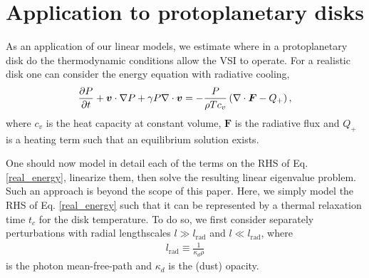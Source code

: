 \section{Application to protoplanetary disks}\label{application} 
As an application of our linear models, we estimate where in a
protoplanetary disk do the thermodynamic conditions allow the VSI to
operate. For a realistic disk one can consider the energy equation with
radiative cooling, 
\begin{align}\label{real_energy}
\frac{\partial P}{\partial t} + \bm{v}\cdot\nabla P +\gamma P \nabla\cdot\bm{v} = - \frac{P}{\rho T
  c_v}\left(\nabla\cdot\bm{F} - Q_+\right), 
 \end{align}
where $c_v$ is the heat capacity at constant
volume, 
$\bm{F}$ is the radiative flux and $Q_+$ is a heating
term such that an equilibrium solution exists. 

One should now model in detail each of the terms on the RHS of
Eq. \ref{real_energy}, linearize them, then solve 
the resulting linear eigenvalue problem. Such an approach is beyond 
the scope of this paper. Here, we simply model the RHS of 
Eq. \ref{real_energy} such that it can be represented by a 
thermal relaxation time $t_c$ for the disk temperature. 
To do so, we first consider separately perturbations
with radial lengthscales $l\gg l_\mathrm{rad}$ and 
$l\ll l_\mathrm{rad}$, where      
\begin{align}\label{lrad}
  l_\mathrm{rad} \equiv \frac{1}{\kappa_d\rho} 
\end{align} 
is the photon mean-free-path and $\kappa_d$ is the (dust) opacity. 


